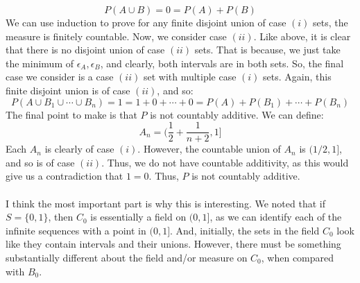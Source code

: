 \documentclass[12pt,a4paper]{article}
\newcommand{\1}[1]{\mathbbm{1}\left\{ #1 \right\}}
\begin{document}
$$
	P(A \cup B) = 0 = P(A) + P(B)
$$
We can use induction to prove for any finite disjoint union of case $(i)$ sets, the measure is finitely countable. Now, we consider case $(ii)$. Like above, it is clear that there is no disjoint union of case $(ii)$ sets. That is because, we just take the minimum of $\epsilon_A,\epsilon_B$, and clearly, both intervals are in both sets. So, the final case we consider is a case $(ii)$ set with multiple case $(i)$ sets. Again, this finite disjoint union is of case $(ii)$, and so:
$$
	P(A \cup B_1 \cup \cdots \cup B_n) = 1 = 1 + 0 + \cdots + 0 = P(A) + P(B_1) + \cdots + P(B_n)
$$
The final point to make is that $P$ is not countably additive. We can define:
$$
	A_n = \bigg(\frac{1}{2} + \frac{1}{n+2},1\bigg]
$$
Each $A_n$ is clearly of case $(i)$. However, the countable union of $A_n$ is $(1/2,1]$, and so is of case $(ii)$. Thus, we do not have countable additivity, as this would give us a contradiction that $1 = 0$. Thus, $P$ is not countably additive.
\\\\
I think the most important part is why this is interesting. We noted that if $S = \{0,1\}$, then $C_0$ is essentially a field on $(0,1]$, as we can identify each of the infinite sequences with a point in $(0,1]$. And, initially, the sets in the field $C_0$ look like they contain intervals and their unions. However, there must be something substantially different about the field and/or measure on $C_0$, when compared with $B_0$.
\end{document}
